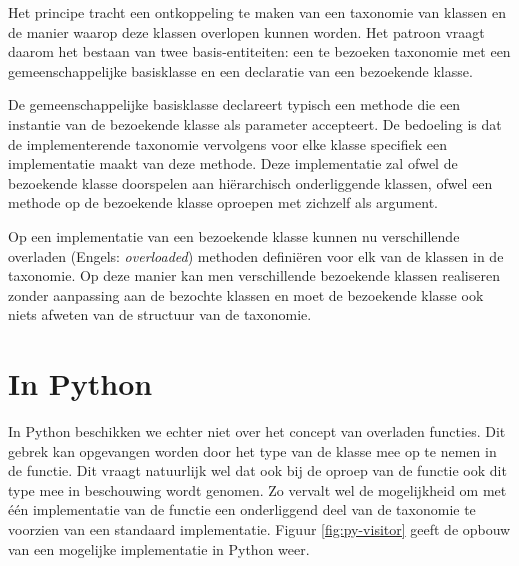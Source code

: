 Het principe tracht een ontkoppeling te maken van een taxonomie van klassen en
de manier waarop deze klassen overlopen kunnen worden. Het patroon vraagt
daarom het bestaan van twee basis-entiteiten: een te bezoeken taxonomie met een
gemeenschappelijke basisklasse en een declaratie van een bezoekende klasse.

De gemeenschappelijke basisklasse declareert typisch een methode 
die een instantie van de bezoekende klasse als parameter accepteert. De
bedoeling is dat de implementerende taxonomie vervolgens voor elke klasse
specifiek een implementatie maakt van deze methode. Deze implementatie zal
ofwel de bezoekende klasse doorspelen aan hi\"erarchisch onderliggende klassen,
ofwel een  methode op de bezoekende klasse oproepen met zichzelf als
argument.

Op een implementatie van een bezoekende klasse kunnen nu verschillende
overladen (Engels: \emph{overloaded}) methoden defini\"eren voor elk van de
klassen in de taxonomie. Op deze manier kan men verschillende bezoekende
klassen realiseren zonder aanpassing aan de bezochte klassen en moet de
bezoekende klasse ook niets afweten van de structuur van de taxonomie.

\section{In Python}

In Python beschikken we echter niet over het concept van overladen functies.
Dit gebrek kan opgevangen worden door het type van de klasse mee op te nemen in
de  functie. Dit vraagt natuurlijk wel dat ook bij de oproep van de
 functie ook dit type mee in beschouwing wordt genomen. Zo
vervalt wel de mogelijkheid om met \'e\'en implementatie van de functie een
onderliggend deel van de taxonomie te voorzien van een standaard implementatie.
Figuur \ref{fig:py-visitor} geeft de opbouw van een mogelijke implementatie in
Python weer.

